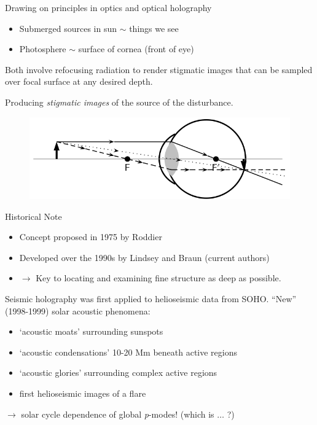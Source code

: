 \documentclass{beamer}
\begin{document}
\begin{frame}{Drawing on principles in optics and optical holography}
    \begin{itemize}
        \item Submerged sources in sun $\sim$ things we see
        \item Photosphere $\sim$ surface of cornea (front of eye)
    \end{itemize}
    Both involve refocusing radiation to render stigmatic images
    that can be sampled over focal surface at any desired depth.

    Producing \emph{stigmatic images} of the source of the disturbance.
    \begin{figure}
    \includegraphics[width=\textwidth]{eye.png}
    \end{figure}
\end{frame}

\begin{frame}{Historical Note}
    \begin{itemize}
        \item Concept proposed in 1975 by Roddier
        \item Developed over the 1990s by Lindsey and Braun
            (current authors)
        \item $\rightarrow$ Key to locating and examining
        fine structure as deep as possible.
    \end{itemize}
    Seismic holography was first applied to helioseismic data from SOHO\@.
    ``New'' (1998-1999) solar acoustic phenomena:
    \begin{itemize}
        \item `acoustic moats' surrounding sunspots
        \item `acoustic condensations' 10-20 Mm beneath active regions
        \item `acoustic glories' surrounding complex active regions
        \item first helioseismic images of a flare
    \end{itemize}
    $\rightarrow$ solar cycle dependence of global \emph{p}-modes!
    (which is $\ldots$ ?)
\end{frame}
\end{document}
